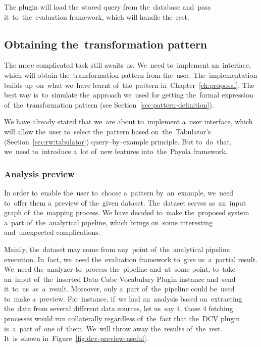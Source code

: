 The plugin will load the~stored query from the~database and~pass it~to~the~evaluation framework, which will handle the~rest.

\subsection{Obtaining the~transformation pattern}
The more complicated task still awaits us. We~need to~implement an~interface, 
which will obtain the~transformation pattern from the~user. The~implementation 
builds up~on~what we~have learnt of~the~pattern in~Chapter~\ref{ch:proposal}.
The best way is~to~simulate the~approach we~used for getting the~formal expression of~the~transformation pattern
(see Section~\ref{sec:pattern-definition}).

We have already stated that we~are about to~implement a~user interface, which 
will allow the~user to~select the~pattern based on~the~Tabulator's (Section~\ref{sec:rw:tabulator})
query--by--example principle. But to~do~that, we~need to~introduce a~lot of~new 
features into~the~Payola framework.

\subsubsection{Analysis preview}
In order to~enable the~user to~choose a~pattern by~an~example, we~need to~offer them a~preview
of the~given dataset. The~dataset serves as~an~input graph of~the~mapping process. 
We have decided to~make the~proposed system a~part of~the~analytical 
pipeline, which brings on~some interesting and~unexpected complications.

Mainly, the~dataset may come from any~point of~the~analytical pipeline execution. In~fact, we~need the~evaluation framework to~give us~a~partial result. We~need the~analyzer to~process the~pipeline and~at~some point, to~take an~input of~the~inserted Data Cube Vocabulary Plugin instance and~send it~to~us~as~a~result. 
Moreover, only a~part of~the~pipeline could be~used to~make a~preview. For~instance, if~we had an~analysis
based on~extracting the~data from several different data sources, 
let us~say 4, those 4 fetching processes would run collaterally regardless of~the~fact that the~DCV plugin is~a~part of~one of~them. We~will throw away the~results of~the~rest. It~is~shown in~Figure~\ref{fig:dcv-preview-useful}.

